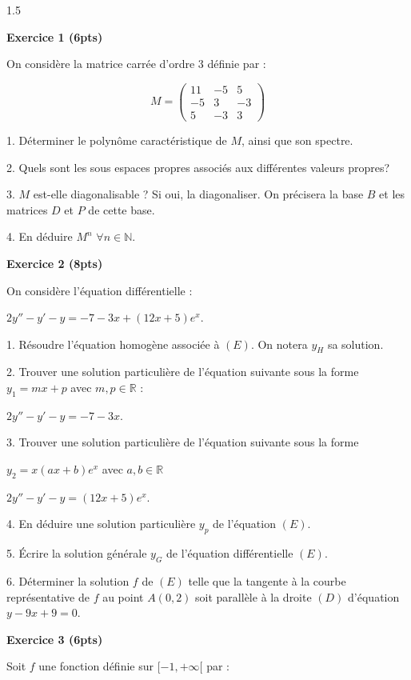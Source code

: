\documentclass[12pt]{article}
\begin{document}
\begin{spacing}{1.5}

\textbf{Exercice 1 (6pts)}


On considère la matrice carrée d'ordre 3 définie par  : 

\[M=\begin{pmatrix}
11 & -5 & 5 \\ 
-5 & 3 & -3 \\ 
5 & -3 & 3
\end{pmatrix}\]

1. Déterminer le polynôme caractéristique de $M$, ainsi que son spectre.

2. Quels sont les sous espaces propres associés aux différentes valeurs propres?

3. $M$ est-elle diagonalisable ? Si oui, la diagonaliser. On précisera la base $B$ et les matrices $D$ et $P$ de cette base.

4. En déduire $M^{n}$ $\forall n\in \mathbb{N}$.


\medskip
\textbf{Exercice 2 (8pts)}

On considère l'équation différentielle :

\begin{center}
$2y''-y'-y=-7-3x+(12x+5)e^x$.
\end{center}

1. Résoudre l'équation homogène associée à $(E)$. On notera $y_H$ sa solution.

2. Trouver une solution particulière de l'équation suivante sous la forme $y_1=mx+p$ avec $m,p\in \mathbb{R}$ :

$2y''-y'-y=-7-3x$.

3. Trouver une solution particulière de l'équation suivante sous la forme 

$y_2=x(ax+b)e^x$ avec $a,b\in \mathbb{R}$

$2y''-y'-y=(12x+5)e^x$.

4. En déduire une solution particulière $y_p$ de l'équation $(E)$.

5. Écrire la solution générale $y_G$ de l'équation différentielle $(E)$.

6. Déterminer la solution $f$ de $(E)$ telle que la tangente à la courbe représentative de $f$ au point $A(0,2)$ soit parallèle à la droite $(D)$ d'équation $y-9x+9=0$.

\medskip
\textbf{Exercice 3 (6pts)}

Soit $f$ une fonction définie sur $[-1,+\infty[$ par :


\end{spacing}
\end{document}
